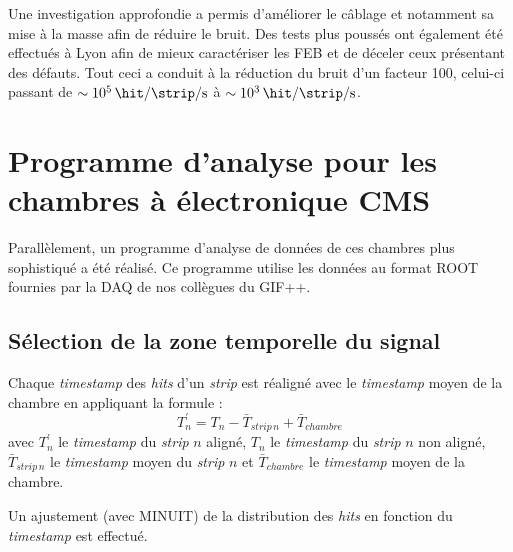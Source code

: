 Une investigation approfondie a permis d'améliorer le câblage et notamment sa mise à la masse afin de réduire le bruit. Des tests plus poussés ont également été effectués à Lyon afin de mieux caractériser les FEB et de déceler ceux présentant des défauts. Tout ceci a conduit à la réduction du bruit d'un facteur \num{100}, celui-ci passant de $\sim\SI{e5}{\hit\per\strip\per\second}$ à $\sim\SI{e3}{\hit\per\strip\per\second}$.
\vspace*{-0.5cm}
\section{Programme d’analyse pour les chambres à électronique CMS}
\vspace*{-0.4cm}
\label{prog}
Parallèlement, un programme d'analyse de données de ces chambres plus sophistiqué a été réalisé. Ce programme utilise les données au format ROOT fournies par la DAQ de nos collègues du GIF++.
\vspace*{-0.4cm}
\subsection{Sélection de la zone temporelle du signal}
\vspace*{-0.4cm}
Chaque \textit{timestamp} des \textit{hits} d'un \textit{strip} est réaligné avec le \textit{timestamp} moyen de la chambre en appliquant la formule :
\begin{equation}
T^{'}_{n}=T_{n}-\bar{T}_{strip\, n}+\bar{T}_{chambre}
\end{equation}
avec $T^{'}_{n}$ le \textit{timestamp} du \textit{strip} $n$ aligné, $T_{n}$ le \textit{timestamp} du \textit{strip} $n$ non aligné, $\bar{T}_{strip\, n}$ le \textit{timestamp} moyen du \textit{strip} $n$ et $\bar{T}_{chambre}$ le \textit{timestamp} moyen de la chambre. 

Un ajustement (avec MINUIT) de la distribution des \textit{hits} en fonction du \textit{timestamp} est effectué. 

